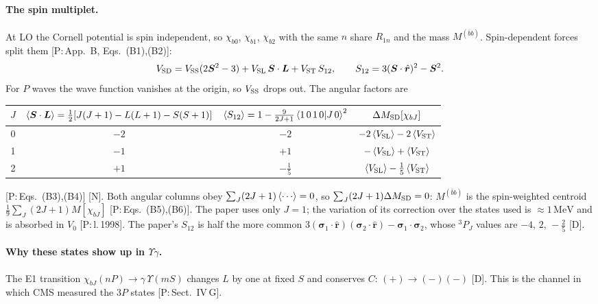 \documentclass[11pt,a4paper]{article}
\newcommand{\tagP}[1]{\textcolor{blue!65!black}{\textsf{\small[P:\,#1]}}}
\newcommand{\tagD}{\textcolor{orange!85!black}{\textsf{\small[D]}}}
\newcommand{\tagN}{\textcolor{red!70!black}{\textsf{\small[N]}}}
\renewcommand{\MeV}{\,\mathrm{MeV}}
\begin{document}
\paragraph{The spin multiplet.} At LO the Cornell potential is spin independent, so $\chi_{b0}$, $\chi_{b1}$, $\chi_{b2}$ with the same $n$ share $R_{1n}$ and the mass $M^{(\bar bb)}$. Spin-dependent forces split them \tagP{App.~B, Eqs.~(B1),(B2)}:
\begin{equation}
V_{\rm SD}=V_{\rm SS}(2\bm S^2-3)+V_{\rm SL}\,\bm S\cdot\bm L+V_{\rm ST}\,S_{12},\qquad S_{12}=3(\bm S\cdot\hat{\bm r})^2-\bm S^2 .
\end{equation}
For $P$ waves the wave function vanishes at the origin, so $V_{\rm SS}$ drops out. The angular factors are
\begin{center}
\small
\begin{tabular}{cccc}
\toprule
$J$ & $\braket{\bm S\cdot\bm L}=\frac12[J(J+1)-L(L+1)-S(S+1)]$ & $\braket{S_{12}}=1-\frac{9}{2J+1}\braket{1\,0\,1\,0|J\,0}^2$ & $\Delta M_{\rm SD}[\chi_{bJ}]$\\
\midrule
0 & $-2$ & $-2$ & $-2\braket{V_{\rm SL}}-2\braket{V_{\rm ST}}$\\
1 & $-1$ & $+1$ & $-\braket{V_{\rm SL}}+\braket{V_{\rm ST}}$\\
2 & $+1$ & $-\frac15$ & $\braket{V_{\rm SL}}-\frac15\braket{V_{\rm ST}}$\\
\bottomrule
\end{tabular}
\end{center}
\tagP{Eqs.~(B3),(B4)} \tagN. Both angular columns obey $\sum_J(2J+1)\braket{\cdots}=0$, so $\sum_J(2J+1)\Delta M_{\rm SD}=0$: $M^{(\bar bb)}$ is the spin-weighted centroid $\frac19\sum_J(2J+1)M[\chi_{bJ}]$ \tagP{Eqs.~(B5),(B6)}. The paper uses only $J=1$; the variation of its correction over the states used is $\approx1\MeV$ and is absorbed in $V_0$ \tagP{l.\,1998}. The paper's $S_{12}$ is half the more common $3(\bm\sigma_1\cdot\hat{\bm r})(\bm\sigma_2\cdot\hat{\bm r})-\bm\sigma_1\cdot\bm\sigma_2$, whose $^3P_J$ values are $-4,\,2,\,-\frac25$ \tagD.

\paragraph{Why these states show up in $\Upsilon\gamma$.} The E1 transition $\chi_{bJ}(nP)\to\gamma\,\Upsilon(mS)$ changes $L$ by one at fixed $S$ and conserves $C$: $(+)\to(-)(-)$ \tagD. This is the channel in which CMS measured the $3P$ states \tagP{Sect.~IV\,G}.
\end{document}
